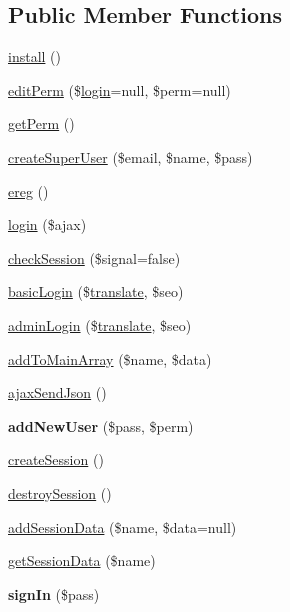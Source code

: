 \subsection*{Public Member Functions}
\begin{DoxyCompactItemize}
\item 
\hyperlink{classlog_man_aa966adc12c56a4cc70da92207fa50929}{install} ()
\item 
\hyperlink{classlog_man_a52a57cda7a4b849ed18d5c7133f75256}{edit\-Perm} (\$\hyperlink{classlog_man_a3b510811361c14194c4c54177f000f2d}{login}=null, \$perm=null)
\item 
\hyperlink{classlog_man_a3884708300d256bc4e2aed3d425ec00a}{get\-Perm} ()
\item 
\hyperlink{classlog_man_ae8162eecf899a411b0f91d013d16cda3}{create\-Super\-User} (\$email, \$name, \$pass)
\item 
\hyperlink{classlog_man_af787db5c087b93924fc5ac54e14775d5}{ereg} ()
\item 
\hyperlink{classlog_man_a3b510811361c14194c4c54177f000f2d}{login} (\$ajax)
\item 
\hyperlink{classlog_man_aa8dfc7c51361d8f550975be90ed2cf67}{check\-Session} (\$signal=false)
\item 
\hyperlink{classlog_man_a9a30d68c9f462839242a462ca43f5753}{basic\-Login} (\$\hyperlink{classtranslate}{translate}, \$seo)
\item 
\hyperlink{classlog_man_ab0912c8df7035bb6e9571a4333c0238a}{admin\-Login} (\$\hyperlink{classtranslate}{translate}, \$seo)
\item 
\hyperlink{classlog_man_a64ac0e06faad327b014754e951dfe170}{add\-To\-Main\-Array} (\$name, \$data)
\item 
\hyperlink{classlog_man_a89196d2fcfb896306fe7e387f634a080}{ajax\-Send\-Json} ()
\item 
\hypertarget{classlog_man_a7f3e615305910cf5ea9f24692e9613f6}{{\bfseries add\-New\-User} (\$pass, \$perm)}\label{classlog_man_a7f3e615305910cf5ea9f24692e9613f6}

\item 
\hyperlink{classlog_man_ad0c5594c7e33c9821afd4305edaee0b9}{create\-Session} ()
\item 
\hyperlink{classlog_man_a9aea96aaeaf1efd5531eb1867ee67ca6}{destroy\-Session} ()
\item 
\hyperlink{classlog_man_a63e86500ba57ad327c3cfdc4777b2edc}{add\-Session\-Data} (\$name, \$data=null)
\item 
\hyperlink{classlog_man_a0055230648d2a2484c489013a475c3d7}{get\-Session\-Data} (\$name)
\item 
\hypertarget{classlog_man_a0bb131a01e8d92cdecdc9013ca808013}{{\bfseries sign\-In} (\$pass)}\label{classlog_man_a0bb131a01e8d92cdecdc9013ca808013}


\end{DoxyCompactItemize}
